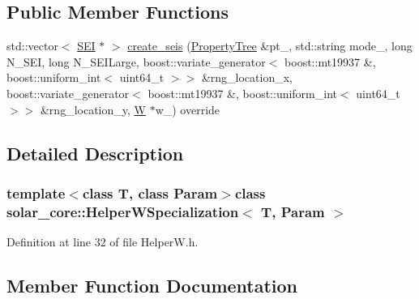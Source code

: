 \subsection*{Public Member Functions}
\begin{DoxyCompactItemize}
\item 
std\+::vector$<$ \hyperlink{classsolar__core_1_1_s_e_i}{S\+E\+I} $\ast$ $>$ \hyperlink{classsolar__core_1_1_helper_w_specialization_a738f047f9e421dcac3739f9898242c09}{create\+\_\+seis} (\hyperlink{namespacesolar__core_adeda2737d6938c190eb774a5b2495045}{Property\+Tree} \&pt\+\_\+, std\+::string mode\+\_\+, long N\+\_\+\+S\+E\+I, long N\+\_\+\+S\+E\+I\+Large, boost\+::variate\+\_\+generator$<$ boost\+::mt19937 \&, boost\+::uniform\+\_\+int$<$ uint64\+\_\+t $>$$>$ \&rng\+\_\+location\+\_\+x, boost\+::variate\+\_\+generator$<$ boost\+::mt19937 \&, boost\+::uniform\+\_\+int$<$ uint64\+\_\+t $>$$>$ \&rng\+\_\+location\+\_\+y, \hyperlink{classsolar__core_1_1_w}{W} $\ast$w\+\_\+) override
\end{DoxyCompactItemize}


\subsection{Detailed Description}
\subsubsection*{template$<$class T, class Param$>$class solar\+\_\+core\+::\+Helper\+W\+Specialization$<$ T, Param $>$}



Definition at line 32 of file Helper\+W.\+h.



\subsection{Member Function Documentation}
\hypertarget{classsolar__core_1_1_helper_w_specialization_a738f047f9e421dcac3739f9898242c09}{}
